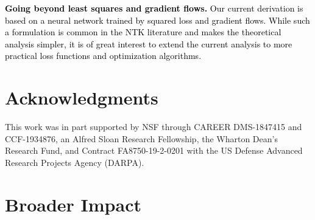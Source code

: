\textcolor{black}{{\bf Going beyond least squares and gradient flows.} Our current derivation is based on a neural network trained by squared loss and gradient flows. While such a formulation is common in the NTK literature and makes the theoretical analysis simpler, it is of great interest to extend the current analysis to more practical loss functions and optimization algorithms.}


\section*{Acknowledgments}

This work was in part supported by NSF through CAREER DMS-1847415 and CCF-1934876, an Alfred Sloan Research Fellowship, the Wharton Dean's Research Fund, and Contract FA8750-19-2-0201 with the US Defense Advanced Research Projects Agency (DARPA). 





\section*{Broader Impact}


